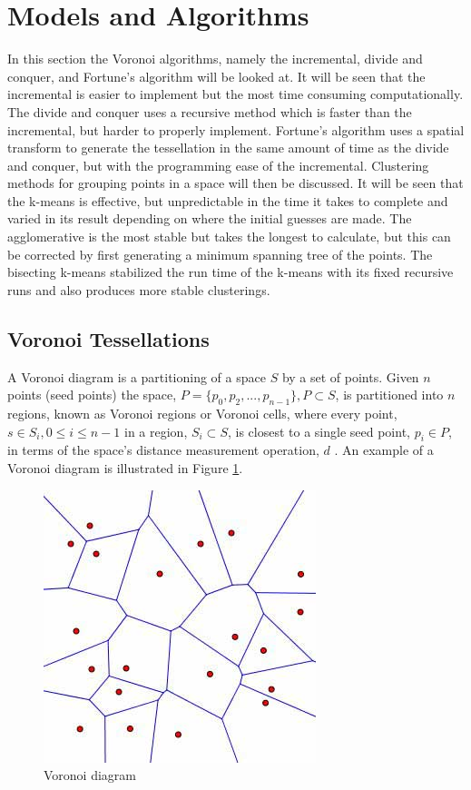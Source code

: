 \section{Models and Algorithms}\label{tes}
In this section the Voronoi algorithms, namely the incremental, divide and conquer, and Fortune's algorithm will be looked at. It will be seen that the incremental is easier to implement but the most time consuming computationally. The divide and conquer uses a recursive method which is faster than the incremental, but harder to properly implement. Fortune's algorithm uses a spatial transform to generate the tessellation in the same amount of time as the divide and conquer, but with the programming ease of the incremental. Clustering methods for grouping points in a space will then be discussed. It will be seen that the k-means is effective, but unpredictable in the time it takes to complete and varied in its result depending on where the initial guesses are made. The agglomerative is the most stable but takes the longest to calculate, but this can be corrected by first generating a minimum spanning tree of the points. The bisecting k-means stabilized the run time of the k-means with its fixed recursive runs and also produces more stable clusterings.
\subsection{Voronoi Tessellations}\label{tes:sec:vor}
A Voronoi diagram is a partitioning of a space $S$ by a set of points. Given $n$ points (seed points) the space, $P = \{p_0,p_2,...,p_{n-1}\}, P \subset S$, is partitioned into $n$ regions, known as Voronoi regions or Voronoi cells, where every point, $s \in S_i,0 \leq i \leq n-1$ in a region, $S_i \subset S$, is closest to a single seed point, $p_i \in P$, in terms of the space's distance measurement operation, $d$ \citep{okabe2009spatial}. An example of a Voronoi diagram is illustrated in Figure \ref{tes:fig:voreg}.
%
\begin{figure}[H]
    \centering
    \includegraphics[scale=0.65]{Images/voronoi.jpg}
    \caption[]{Voronoi diagram\footnotemark}
    \label{tes:fig:voreg}
\end{figure}
%
